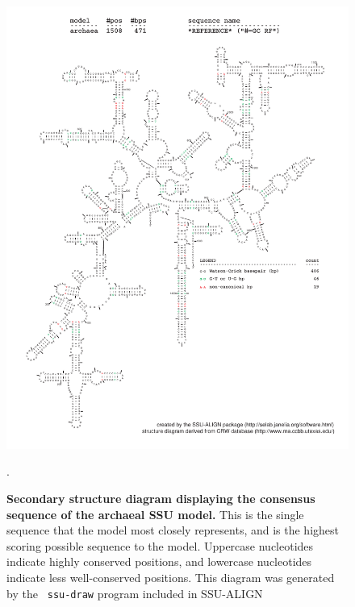 \begin{figure}[hb]
\begin{center}
\includegraphics[width=5.7in]{Figures/archaea-0p1-rf}
\end{center}
\caption[Secondary structure diagram displaying the consensus sequence
  of the archaeal SSU model]{\textbf{Secondary structure diagram displaying the
  consensus sequence of the archaeal SSU model.} 
  This is the single sequence that the model 
  most closely represents, and is the highest scoring possible
  sequence to the model. Uppercase nucleotides indicate highly conserved positions,
  and lowercase nucleotides indicate less well-conserved positions.
  This diagram was generated by the {\tt
  ssu-draw} program included in SSU-ALIGN}.
\label{fig:arcrf}
\end{figure}

\newpage 

